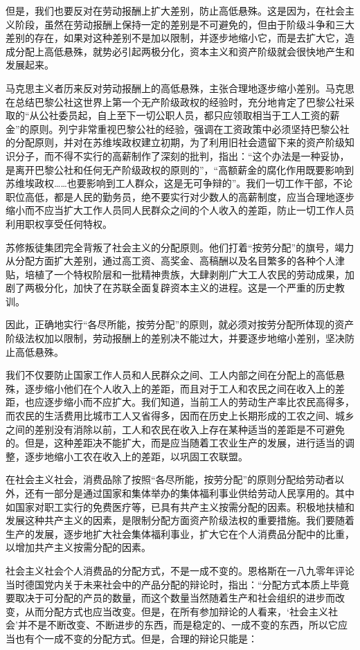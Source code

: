 \documentclass{book}
\begin{document}
但是，我们也要反对在劳动报酬上扩大差别，防止高低悬殊。这是因为，在社会主义阶段，虽然在劳动报酬上保持一定的差别是不可避免的，但由于阶级斗争和三大差别的存在，如果对这种差别不是加以限制，并逐步地缩小它，而是去扩大它，造成分配上高低悬殊，就势必引起两极分化，资本主义和资产阶级就会很快地产生和发展起来。

马克思主义者历来反对劳动报酬上的高低悬殊，主张合理地逐步缩小差别。马克思在总结巴黎公社这世界上第一个无产阶级政权的经验时，充分地肯定了巴黎公社采取的“从公社委员起，自上至下一切公职人员，都只应领取相当于工人工资的薪金”的原则。列宁非常重视巴黎公社的经验，强调在工资政策中必须坚持巴黎公社的分配原则，并对在苏维埃政权建立初期，为了利用旧社会遗留下来的资产阶级知识分子，而不得不实行的高薪制作了深刻的批判，指出：“这个办法是一种妥协，是离开巴黎公社和任何无产阶级政权的原则的”，“高额薪金的腐化作用既要影响到苏维埃政权……也要影响到工人群众，这是无可争辩的”。我们一切工作干部，不论职位高低，都是人民的勤务员，绝不要实行对少数人的高薪制度，应当合理地逐步缩小而不应当扩大工作人员同人民群众之间的个人收入的差距，防止一切工作人员利用职权享受任何特权。

苏修叛徒集团完全背叛了社会主义的分配原则。他们打着“按劳分配”的旗号，竭力从分配方面扩大差别，通过高工资、高奖金、高稿酬以及名目繁多的各种个人津贴，培植了一个特权阶层和一批精神贵族，大肆剥削广大工人农民的劳动成果，加剧了两极分化，加快了在苏联全面复辟资本主义的进程。这是一个严重的历史教训。

因此，正确地实行“各尽所能，按劳分配”的原则，就必须对按劳分配所体现的资产阶级法权加以限制，劳动报酬上的差别决不能过大，并要逐步地缩小差别，坚决防止高低悬殊。

我们不仅要防止国家工作人员和人民群众之间、工人内部之间在分配上的高低悬殊，逐步缩小他们在个人收入上的差距，而且对于工人和农民之间在收入上的差距，也应逐步缩小而不应扩大。我们知道，当前工人的劳动生产率比农民高得多，而农民的生活费用比城市工人又省得多，因而在历史上长期形成的工农之间、城乡之间的差别没有消除以前，工人和农民在收入上存在某种适当的差距是不可避免的。但是，这种差距决不能扩大，而是应当随着工农业生产的发展，进行适当的调整，逐步地缩小工农在收入上的差距，以巩固工农联盟。

在社会主义社会，消费品除了按照“各尽所能，按劳分配”的原则分配给劳动者以外，还有一部分是通过国家和集体举办的集体福利事业供给劳动人民享用的。其中如国家对职工实行的免费医疗等，已具有共产主义按需分配的因素。积极地扶植和发展这种共产主义的因素，是限制分配方面资产阶级法权的重要措施。我们要随着生产的发展，逐步地扩大社会集体福利事业，扩大它在个人消费品分配中的比重，以增加共产主义按需分配的因素。

社会主义社会个人消费品的分配方式，不是一成不变的。恩格斯在一八九零年评论当时德国党内关于未来社会中的产品分配的辩论时，指出：“分配方式本质上毕竟要取决于可分配的产员的数量，而这个数量当然随着生产和社会组织的进步而改变，从而分配方式也应当改变。但是，在所有参加辩论的人看来，‘社会主义社会’并不是不断改变、不断进步的东西，而是稳定的、一成不变的东西，所以它应当也有个一成不变的分配方式。但是，合理的辩论只能是：
\end{document}
